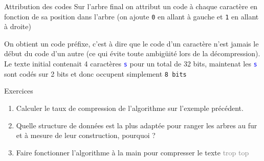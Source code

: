 \documentclass[10pt]{beamer}
\begin{document}
\begin{frame}{\Ctitle}{\stitle}
	\begin{block}{Attribution des codes}
		Sur l'arbre final on attribut un code à chaque caractère en fonction de sa position dans l'arbre (on ajoute \textcolor{OliveGreen}{\tt 0} en allant à gauche et \textcolor{OliveGreen}{\tt 1} en allant à droite)
		\begin{center}
			 \vspace{0.7cm}
		\end{center}
		On obtient un \textcolor{BrickRed}{code préfixe}, c'est à dire que le code d'un caractère n'est jamais le début du code d'un autre (ce qui évite toute ambigüité lors de la décompression).
		Le texte initial contenait 4 caractères \textcolor{blue}{\tt s} pour un total de 32 bits, maintenat les \textcolor{blue}{\tt s} sont codés sur 2 bits et donc  occupent simplement {\tt 8 bits}
	\end{block}
\end{frame}

\begin{frame}{\Ctitle}{\stitle}
	\begin{exampleblock}{Exercices}
		\begin{enumerate}
			\item <1-> Calculer le taux de compression de l'algorithme sur l'exemple précédent.
			\item <2-> Quelle structure de données est la plus adaptée pour ranger les arbres au fur et à mesure de leur construction, pourquoi ?
			\item <3-> Faire fonctionner l'algorithme à la main pour compresser le texte \og{}\textcolor{gray}{trop top}\fg{}
		\end{enumerate}
	\end{exampleblock}
\end{frame}
\end{document}

